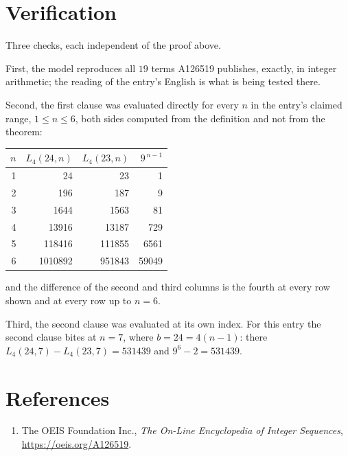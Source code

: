 \documentclass[11pt,a4paper]{article}
\theoremstyle{plain}
\theoremstyle{definition}
\begin{document}
\section{Verification}

Three checks, each independent of the proof above.

First, the model reproduces all $19$ terms A126519 publishes, exactly, in integer
arithmetic; the reading of the entry's English is what is being tested there.

Second, the first clause was evaluated directly for every $n$ in the entry's claimed range,
$1\le n\le6$, both sides computed from the definition and not from the theorem:

\begin{center}
\begin{tabular}{rrrr}
$n$ & $L_{4}(24,n)$ & $L_{4}(23,n)$ & $9^{\,n-1}$ \\ \hline
1 & 24 & 23 & 1 \\
2 & 196 & 187 & 9 \\
3 & 1644 & 1563 & 81 \\
4 & 13916 & 13187 & 729 \\
5 & 118416 & 111855 & 6561 \\
6 & 1010892 & 951843 & 59049 \\
\end{tabular}
\end{center}

\noindent and the difference of the second and third columns is the fourth at every row shown
and at every row up to $n=6$.

Third, the second clause was evaluated at its own index. For this entry the second clause bites at $n=7$, where $b=24=4(n-1)$: there $L_{4}(24,7)-L_{4}(23,7)=531439$ and $9^{6}-2=531439$.

\section*{References}
\begin{enumerate}
\item The OEIS Foundation Inc., \emph{The On-Line Encyclopedia of Integer Sequences},
\url{https://oeis.org/A126519}.
\end{enumerate}
\end{document}
